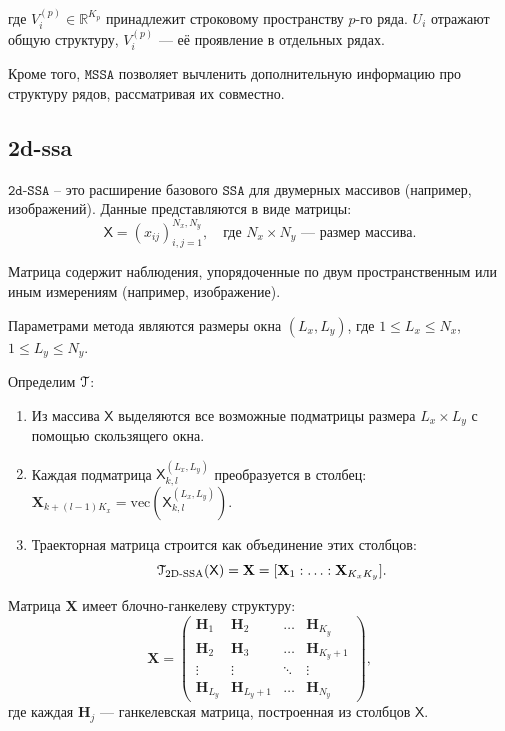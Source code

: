 \documentclass[12pt, specialist, subf
]{disser}
\theoremstyle{definition}
\newcommand{\SSA}{\texttt{SSA}}
\newcommand{\MSSA}{\texttt{MSSA}}
\newcommand{\DSSA}{\texttt{2d-SSA}}
\newcommand{\TS}{\mathsf{X}}
\newcommand{\EMB}{\EuScript{T}}
\begin{document}
где $V_i^{(p)} \in \mathbb{R}^{K_p}$ принадлежит строковому пространству $p$-го ряда. $U_i$ отражают общую структуру, $V_i^{(p)}$ — её проявление в отдельных рядах.


Кроме того, $\MSSA$ позволяет вычленить дополнительную информацию про структуру рядов, рассматривая их совместно.



\subsection{2d-ssa}

$\DSSA$ -- это расширение базового $\SSA$ для двумерных массивов \cite{ssa_with_R} (например, изображений). Данные представляются в виде матрицы:
\[
	\TS = (x_{ij})_{i,j=1}^{N_x, N_y}, \quad \text{где } N_x \times N_y \text{ — размер массива.}
\]

Матрица содержит наблюдения, упорядоченные по двум пространственным или иным измерениям (например, изображение).

Параметрами метода являются размеры {окна} $(L_x, L_y)$, где $1 \leq L_x \leq N_x$, $1 \leq L_y \leq N_y$.

Определим $\EMB$: 

\begin{enumerate}
	\item Из массива $\TS$ выделяются {все возможные подматрицы} размера $L_x \times L_y$ с помощью скользящего окна.
	\item Каждая подматрица $\TS_{k,l}^{(L_x, L_y)}$ преобразуется в столбец: $\mathbf{X}_{k+(l-1)K_x} = \text{vec}(\TS_{k,l}^{(L_x, L_y)})$.
	\item Траекторная матрица строится как объединение этих столбцов:
	      \[
		      \EuScript{T}_{\text{2D-SSA}}(\TS) = \mathbf{X} = [\mathbf{X}_1 : \ldots : \mathbf{X}_{K_x K_y}].
	      \]
\end{enumerate}

Матрица $\mathbf{X}$ имеет {блочно-ганкелеву структуру}:
\[
	\mathbf{X} =
	\begin{pmatrix}
		\mathbf{H}_1     & \mathbf{H}_2       & \ldots & \mathbf{H}_{K_y}   \\
		\mathbf{H}_2     & \mathbf{H}_3       & \ldots & \mathbf{H}_{K_y+1} \\
		\vdots           & \vdots             & \ddots & \vdots             \\
		\mathbf{H}_{L_y} & \mathbf{H}_{L_y+1} & \ldots & \mathbf{H}_{N_y}
	\end{pmatrix},
\]
где каждая $\mathbf{H}_j$ — ганкелевская матрица, построенная из столбцов $\TS$.
\end{document}
